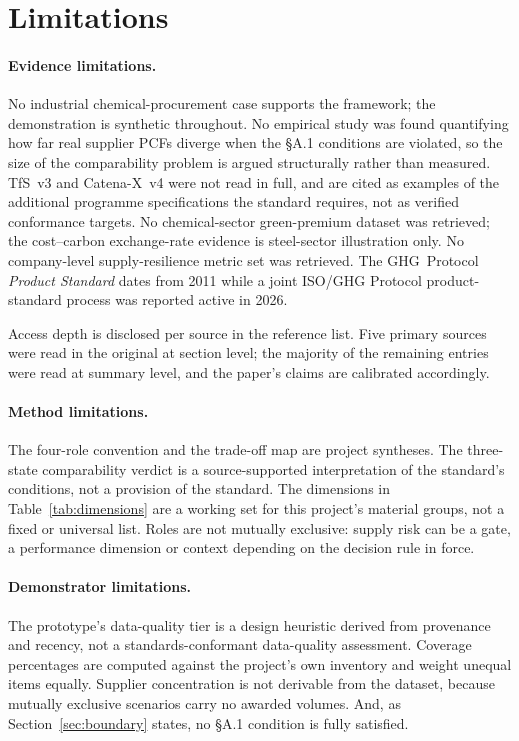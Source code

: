 \documentclass[10pt,twocolumn,a4paper]{article}
\begin{document}
\section{Limitations}
\label{sec:limits}

\paragraph{Evidence limitations.} No industrial chemical-procurement case
supports the framework; the demonstration is synthetic throughout. No empirical
study was found quantifying how far real supplier PCFs diverge when the \S A.1
conditions are violated, so the size of the comparability problem is argued
structurally rather than measured. TfS~v3 and Catena-X~v4 were not read in full,
and are cited as examples of the additional programme specifications the standard
requires, not as verified conformance targets. No chemical-sector green-premium
dataset was retrieved; the cost--carbon exchange-rate evidence is steel-sector
illustration only. No company-level supply-resilience metric set was retrieved.
The GHG~Protocol \emph{Product Standard} dates from 2011 while a joint ISO/GHG
Protocol product-standard process was reported active in 2026.

Access depth is disclosed per source in the reference list. Five primary sources
were read in the original at section level; the majority of the remaining entries
were read at summary level, and the paper's claims are calibrated accordingly.

\paragraph{Method limitations.} The four-role convention and the trade-off map are
project syntheses. The three-state comparability verdict is a source-supported
interpretation of the standard's conditions, not a provision of the standard.
The dimensions in Table~\ref{tab:dimensions} are a working set for this
project's material groups, not a fixed or universal list. Roles are not mutually
exclusive: supply risk can be a gate, a performance dimension or context
depending on the decision rule in force.

\paragraph{Demonstrator limitations.} The prototype's data-quality tier is a
design heuristic derived from provenance and recency, not a standards-conformant
data-quality assessment. Coverage percentages are computed against the project's
own inventory and weight unequal items equally. Supplier concentration is not
derivable from the dataset, because mutually exclusive scenarios carry no awarded
volumes. And, as Section~\ref{sec:boundary} states, no \S A.1 condition is fully
satisfied.
\end{document}
